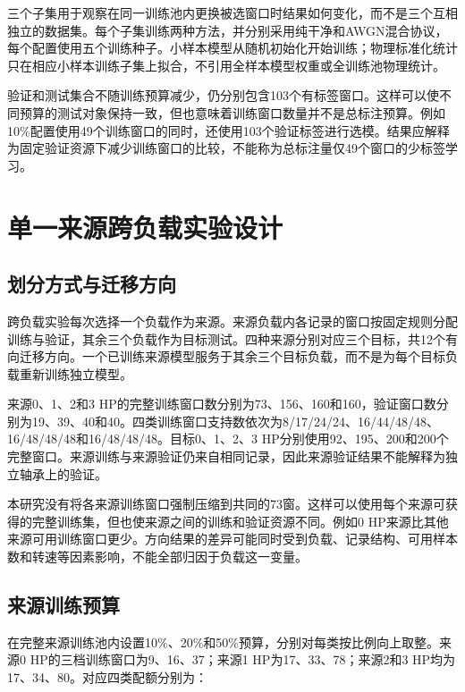 \documentclass[UTF8,12pt,openany,twoside]{ctexbook}
\numberwithin{equation}{chapter}
\begin{document}
三个子集用于观察在同一训练池内更换被选窗口时结果如何变化，而不是三个互相独立的数据集。每个子集训练两种方法，并分别采用纯干净和AWGN混合协议，每个配置使用五个训练种子。小样本模型从随机初始化开始训练；物理标准化统计只在相应小样本训练子集上拟合，不引用全样本模型权重或全训练池物理统计。

验证和测试集合不随训练预算减少，仍分别包含103个有标签窗口。这样可以使不同预算的测试对象保持一致，但也意味着训练窗口数量并不是总标注预算。例如10\%配置使用49个训练窗口的同时，还使用103个验证标签进行选模。结果应解释为固定验证资源下减少训练窗口的比较，不能称为总标注量仅49个窗口的少标签学习。

\section{单一来源跨负载实验设计}\label{ux5355ux4e00ux6765ux6e90ux8de8ux8d1fux8f7dux5b9eux9a8cux8bbeux8ba1}

\subsection{划分方式与迁移方向}\label{ux5212ux5206ux65b9ux5f0fux4e0eux8fc1ux79fbux65b9ux5411}

跨负载实验每次选择一个负载作为来源。来源负载内各记录的窗口按固定规则分配训练与验证，其余三个负载作为目标测试。四种来源分别对应三个目标，共12个有向迁移方向。一个已训练来源模型服务于其余三个目标负载，而不是为每个目标负载重新训练独立模型。

来源0、1、2和3 HP的完整训练窗口数分别为73、156、160和160，验证窗口数分别为19、39、40和40。四类训练窗口支持数依次为8/17/24/24、16/44/48/48、16/48/48/48和16/48/48/48。目标0、1、2、3 HP分别使用92、195、200和200个完整窗口。来源训练与来源验证仍来自相同记录，因此来源验证结果不能解释为独立轴承上的验证。

本研究没有将各来源训练窗口强制压缩到共同的73窗。这样可以使用每个来源可获得的完整训练集，但也使来源之间的训练和验证资源不同。例如0 HP来源比其他来源可用训练窗口更少。方向结果的差异可能同时受到负载、记录结构、可用样本数和转速等因素影响，不能全部归因于负载这一变量。

\subsection{来源训练预算}\label{ux6765ux6e90ux8badux7ec3ux9884ux7b97}

在完整来源训练池内设置10\%、20\%和50\%预算，分别对每类按比例向上取整。来源0 HP的三档训练窗口为9、16、37；来源1 HP为17、33、78；来源2和3 HP均为17、34、80。对应四类配额分别为：
\end{document}
